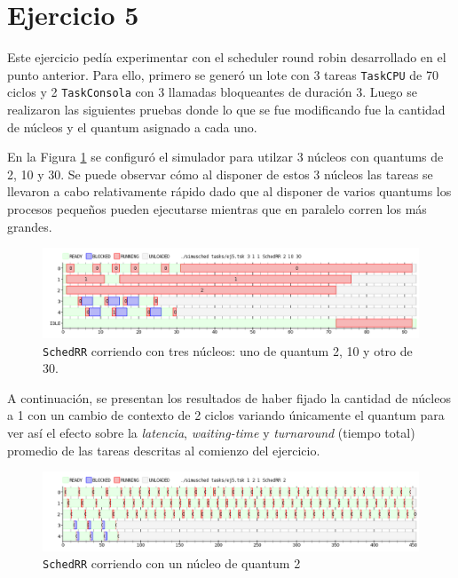 \section{Ejercicio 5}
\label{sec:ej5}

Este ejercicio pedía experimentar con el scheduler round robin desarrollado en
el punto anterior. Para ello, primero se generó un lote con 3 tareas
\texttt{TaskCPU} de 70 ciclos y 2 \texttt{TaskConsola} con 3 llamadas
bloqueantes de duración 3. Luego se realizaron las siguientes pruebas donde lo
que se fue modificando fue la cantidad de núcleos y el quantum asignado a cada
uno.

En la Figura \ref{fig:ej1_3n} se configuró el simulador para utilzar 3 núcleos
con quantums de 2, 10 y 30. Se puede observar cómo al disponer de estos 3
núcleos las tareas se llevaron a cabo relativamente rápido dado que al disponer
de varios quantums los procesos pequeños pueden ejecutarse mientras que en
paralelo corren los más grandes.

\begin{figure}[H]
	\begin{center}
		\includegraphics[width=1\columnwidth]{imagenes/ej5.png}
		\caption{\texttt{SchedRR} corriendo con tres núcleos: uno de quantum 2, 10 y otro de 30.}
		\label{fig:ej1_3n}
	\end{center}
\end{figure}

A continuación, se presentan los resultados de haber fijado la cantidad de núcleos
a 1 con un cambio de contexto de 2 ciclos variando únicamente el quantum para ver
así el efecto sobre la \emph{latencia}, \emph{waiting-time} y \emph{turnaround}
(tiempo total) promedio de las tareas descritas al comienzo del ejercicio.

\begin{figure}[H]
	\begin{center}
		\includegraphics[width=1\columnwidth]{imagenes/ej5_q2.png}
		\caption{\texttt{SchedRR} corriendo con un núcleo de quantum 2}
	\end{center}
\end{figure}

